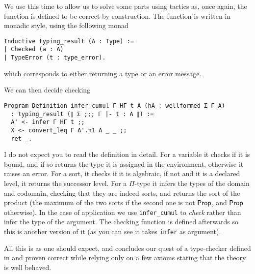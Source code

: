 We use \Program this time to allow us to solve some parts using tactics as,
once again, the function is defined to be correct by construction.
The function is written in monadic style, using the following monad
\begin{verbatim}
Inductive typing_result (A : Type) :=
| Checked (a : A)
| TypeError (t : type_error).
\end{verbatim}
which corresponds to either returning a type or an error message.

We can then decide checking
\begin{verbatim}
Program Definition infer_cumul Γ HΓ t A (hA : wellformed Σ Γ A)
  : typing_result (∥ Σ ;;; Γ |- t : A ∥) :=
  A' <- infer Γ HΓ t ;;
  X <- convert_leq Γ A'.π1 A _ _ ;;
  ret _.
\end{verbatim}

I do not expect you to read the definition in detail. For a variable it checks if
it is bound, and if so returns the type it is assigned in the environment,
otherwise it raises an error.
For a sort, it checks if it is algebraic, if not and it is a declared level,
it returns the successor level.
For a \(\Pi\)-type it infers the types of the domain and codomain, checking that
they are indeed sorts, and returns the sort of the product (\ie the maximum
of the two sorts if the second one is not \(\mathsf{Prop}\), and \(\mathsf{Prop}\) otherwise).
In the case of application we use \texttt{infer_cumul} to \emph{check}
rather than infer the type of the argument. The checking function is defined
afterwards so this is another version of it (as you can see it takes
\texttt{infer} as argument).

All this is as one should expect, and concludes our quest of a type-checker
defined in \Coq and proven correct while relying only on a few axioms stating
that the theory is well behaved.